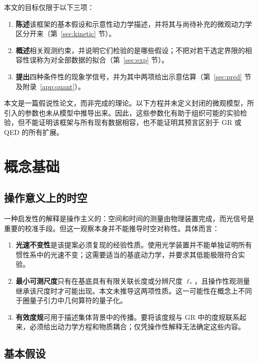 \documentclass[UTF8,fontset=none,11pt,a4paper]{ctexart}
\begin{document}
本文的目标仅限于以下三项：
\begin{enumerate}
\item \textbf{陈述}该框架的基本假设和示意性动力学描述，并将其与尚待补充的微观动力学区分开来（第~\ref{sec:kinetic} 节）。
\item \textbf{概述}相关观测约束，并说明它们检验的是哪些假设；不把对若干选定界限的相容性误称为对全部数据的拟合（第~\ref{sec:exp} 节）。
\item \textbf{提出}四种条件性的现象学信号，并为其中两项给出示意估算（第~\ref{sec:pred} 节及附录~\ref{app:quant}）。
\end{enumerate}
本文是一篇假说性论文，而非完成的理论。以下方程并未定义封闭的微观模型，所引入的参数也未从模型中推导出来。因此，这些参数化有助于组织可能的实验检验，但不能证明该框架与所有现有数据相容，也不能证明其预言区别于 GR 或 QED 的所有扩展。

\section{概念基础}\label{sec:concept}

\subsection{操作意义上的时空}

一种启发性的解释是操作主义的：空间和时间的测量由物理装置完成，而光信号是重要的校准手段。但这一观察本身并不能推导时空对称性。具体而言：
\begin{enumerate}
\item \textbf{光速不变性}是该提案必须复现的经验性质。使用光学装置并不能单独证明所有惯性系中的光速不变；这需要适当的基底动力学，并要求其低能极限符合实验。
\item \textbf{最小可测尺度}只有在基底具有有限关联长度或分辨尺度 $\ell_\ast$，且操作性观测量继承该尺度时才可能出现。本文未推导这两项性质。这一可能性在概念上不同于圈量子引力中几何算符的量子化\cite{Rovelli2015}。
\item \textbf{有效度规}可用于描述集体背景中的传播。要将该度规与 GR 中的度规联系起来，必须给出动力学方程和物质耦合；仅凭操作性解释无法确定这些内容\cite{Volovik2003,Donoghue1994}。
\end{enumerate}

\subsection{基本假设}
\end{document}

